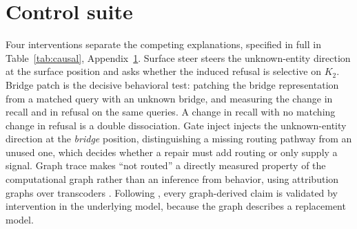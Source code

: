 \documentclass{article}
\begin{document}

\section{Control suite}
\label{app:controls}

Four interventions separate the competing explanations, specified in full in
Table~\ref{tab:causal}, Appendix~\ref{app:controls}. Surface steer steers the unknown-entity direction at the
surface position and asks whether the induced refusal is selective on $K_2$. Bridge patch is the decisive
behavioral test: patching the bridge representation from a matched query with an unknown bridge, and
measuring the change in recall and in refusal on the same queries. A change in recall with no
matching change in refusal is a double dissociation. Gate inject injects the unknown-entity direction at the
\emph{bridge} position, distinguishing a missing routing pathway from an unused one, which decides
whether a repair must add routing or only supply a signal. Graph trace makes ``not routed'' a directly
measured property of the computational graph rather than an inference from behavior, using
attribution graphs over transcoders \citep{ameisen2025circuittracing,hanna2025circuittracer}.
Following \citet{lindsey2025biology}, every graph-derived claim is validated by intervention in the
underlying model, because the graph describes a replacement model.
\end{document}
